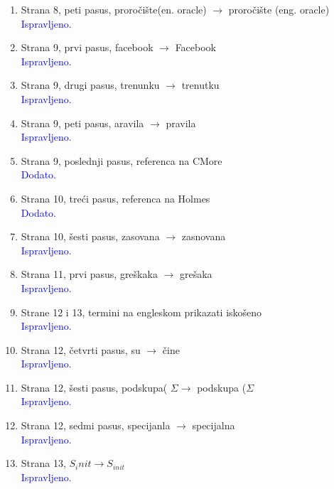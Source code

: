\documentclass[a4paper]{report}
\newcommand{\odgovor}[1]{\textcolor{blue}{#1}}
\begin{document}
\begin{enumerate}
\item Strana 8, peti pasus, proročište(en. oracle) $\rightarrow$ proročište (eng. oracle)
\\ \odgovor{Ispravljeno.}

\item Strana 9, prvi pasus, facebook $\rightarrow$ Facebook
\\ \odgovor{Ispravljeno.}

\item Strana 9, drugi pasus, trenunku $\rightarrow$ trenutku
\\ \odgovor{Ispravljeno.}

\item Strana 9, peti pasus, aravila $\rightarrow$ pravila
\\ \odgovor{Ispravljeno.}

\item Strana 9, poslednji pasus, referenca na CMore
\\ \odgovor{Dodato.}

\item Strana 10, treći pasus, referenca na Holmes
\\ \odgovor{Dodato.}

\item Strana 10, šesti pasus, zasovana $\rightarrow$ zasnovana
\\ \odgovor{Ispravljeno.}

\item Strana 11, prvi pasus, greškaka $\rightarrow$ grešaka
\\ \odgovor{Ispravljeno.}

\item Strane 12 i 13, termini na engleskom prikazati iskošeno
\\ \odgovor{Ispravljeno.}

\item Strana 12, četvrti pasus, su $\rightarrow$ čine
\\ \odgovor{Ispravljeno.}

\item Strana 12, šesti pasus, podskupa( $\Sigma \rightarrow$ podskupa ($\Sigma$
\\ \odgovor{Ispravljeno.}

\item Strana 12, sedmi pasus, specijanla $\rightarrow$ specijalna
\\ \odgovor{Ispravljeno.}

\item Strana 13, $S_init \rightarrow S_{init}$
\\ \odgovor{Ispravljeno.}


\end{enumerate}
\end{document}
